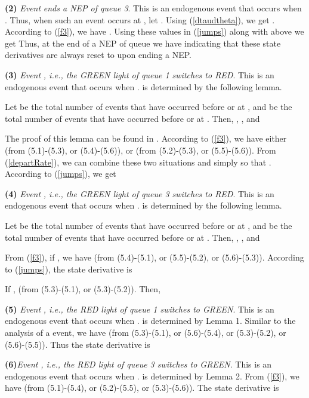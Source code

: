 \documentclass{ifacconf}\usepackage{graphicx}
\begin{document}
\textbf{(2)} \emph{Event }\emph{ ends a NEP of queue 3}. This is an
endogenous event that occurs when . Thus, when such an
event occurs at , let .
Using (\ref{dtaudtheta}), we get . According to (\ref{f3}), we have
. Using these values in (\ref{jumps}) along with
 above we get
Thus, at the end of a NEP  of queue  we have
indicating that these state derivatives are always reset to  upon ending a NEP.

\textbf{(3)} \emph{Event }\emph{, i.e., the GREEN light of queue 1
switches to RED}. This is an endogenous event that occurs when .  is
determined by the following lemma.

\begin{lem}
Let  be the total number of  events that have occurred before or at , and  be the total number of  events that have occurred before or at . Then, , ,  and 
\label{lemma1}
\end{lem}

The proof of this lemma can be found in \cite{GengCDC12}. According to
(\ref{f3}), we have either  (from (5.1)-(5.3), or (5.4)-(5.6)), or
 (from
(5.2)-(5.3), or (5.5)-(5.6)). From (\ref{departRate}), we can combine these
two situations and simply so that . According to (\ref{jumps}), we get



\textbf{(4)} \emph{Event }\emph{, i.e., the GREEN light of queue 3
switches to RED}. This is an endogenous event that occurs when .  is
determined by the following lemma.

\begin{lem}
Let  be the total number of  events that have occurred before or at , and  be the total number of  events that have occurred before or at . Then, , ,  and 
\label{lemma1}
\end{lem}

From (\ref{f3}), if , we have  (from (5.4)-(5.1), or
(5.5)-(5.2), or (5.6)-(5.3)). According to (\ref{jumps}), the state derivative
is

If ,  (from (5.3)-(5.1), or (5.3)-(5.2)). Then,



\textbf{(5)} \emph{Event }\emph{, i.e., the RED light of queue 1
switches to GREEN}. This is an endogenous event that occurs when
. 
is determined by Lemma 1. Similar to the analysis of a  event, we
have 
(from (5.3)-(5.1), or (5.6)-(5.4), or (5.3)-(5.2), or (5.6)-(5.5)). Thus the
state derivative is



\textbf{(6)}\emph{Event }\emph{, i.e., the RED light of queue 3
switches to GREEN}. This is an endogenous event that occurs when
. 
is determined by Lemma 2. From (\ref{f3}), we have  (from (5.1)-(5.4), or
(5.2)-(5.5), or (5.3)-(5.6)). The state derivative is
\end{document}
